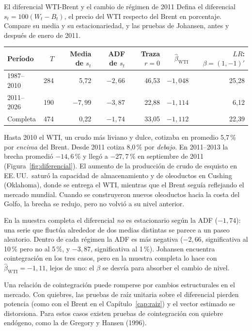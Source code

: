 \begin{ejresuelto}{El diferencial WTI-Brent y el cambio de régimen de 2011}\label{ej:regimen}
\enunciado Defina el diferencial $s_t=100(W_t-B_t)$, el precio del WTI respecto del Brent en porcentaje. Compare su
media y su estacionariedad, y las pruebas de Johansen, antes y después de enero de 2011.

\solucion
{}
\begin{center}\small
\begin{tabular}{@{}lrrrrrr@{}}
\toprule
Período & $T$ & Media de $s_t$ & ADF de $s_t$ & Traza $r=0$ & $\hat\beta_{\text{WTI}}$ & $LR$: $\beta=(1,-1)'$ \\
\midrule
1987--2010 & 284 & 5,72 & $-2{,}66$ & 46,53 & $-1{,}048$ & 25,28 \\
2011--2026 & 190 & $-7{,}99$ & $-3{,}87$ & 22,88 & $-1{,}114$ & 6,12 \\
Completa   & 474 & 0,22 & $-1{,}74$ & 33,05 & $-1{,}112$ & 22,39 \\
\bottomrule
\end{tabular}
\end{center}
Hasta 2010 el WTI, un crudo más liviano y dulce, cotizaba en promedio 5,7\,\% por \emph{encima} del Brent. Desde
2011 cotiza 8,0\,\% por \emph{debajo}. En 2011--2013 la brecha promedió $-14{,}6$\,\% y llegó a $-27{,}7$\,\% en
septiembre de 2011 (Figura~\ref{fig:diferencial}). El aumento de la producción de crudo de esquisto en EE.\,UU.\
saturó la capacidad de almacenamiento y de oleoductos en Cushing (Oklahoma), donde se entrega el WTI, mientras que
el Brent seguía reflejando el mercado mundial. Cuando se construyeron nuevos oleoductos hacia la costa del
Golfo, la brecha se redujo, pero no volvió a su nivel anterior.

 En la muestra completa el diferencial \emph{no} es
estacionario según la ADF ($-1{,}74$): una serie que fluctúa alrededor de dos medias distintas se parece a un
paseo aleatorio. Dentro de cada régimen la ADF es más negativa ($-2{,}66$, significativa al 10\,\% pero no al 5\,\%, y $-3{,}87$,
significativa al 1\,\%). Johansen encuentra cointegración en los tres casos, pero en la muestra completa lo hace
con $\hat\beta_{\text{WTI}}=-1{,}11$, lejos de uno: el $\beta$ se desvía para absorber el cambio de nivel.

 Una relación de cointegración puede romperse por cambios estructurales en el
mercado. Con quiebres, las pruebas de raíz unitaria sobre el diferencial pierden potencia (como con el Brent en
el Capítulo~\ref{cap:raiz}) y el vector estimado se distorsiona. Para estos casos existen pruebas de cointegración
con quiebre endógeno, como la de Gregory y Hansen (1996).


\end{ejresuelto}
